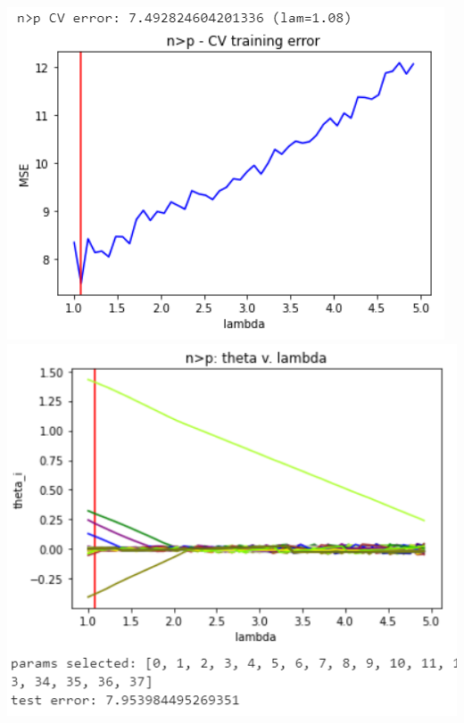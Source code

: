 \documentclass[11pt]{article}
\begin{document}
\begin{center}
\includegraphics[scale=0.7]{charts/bgd_ortho_n_gt_p_err.PNG}
\includegraphics[scale=0.7]{charts/bgd_ortho_n_gt_p_thetas.PNG}


\end{center}
\end{document}
